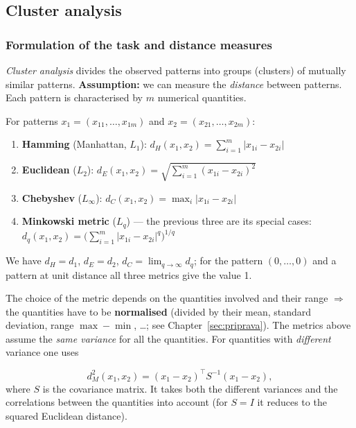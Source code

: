 \documentclass[11pt,a4paper]{article}
\theoremstyle{definition}
\begin{document}
\subsection{Cluster analysis}
\label{ssec:clustering}

\subsubsection{Formulation of the task and distance measures}

\emph{Cluster analysis} divides the observed patterns into groups (clusters) of mutually similar
patterns. \textbf{Assumption:} we can measure the \emph{distance} between patterns. Each pattern is
characterised by $m$ numerical quantities.

\begin{defbox}
For patterns $x_1=(x_{11},\dots,x_{1m})$ and $x_2=(x_{21},\dots,x_{2m})$:
\begin{enumerate}
\item \textbf{Hamming} (Manhattan, $L_1$):
      $d_H(x_1,x_2)=\sum_{i=1}^{m}|x_{1i}-x_{2i}|$
\item \textbf{Euclidean} ($L_2$):
      $d_E(x_1,x_2)=\sqrt{\sum_{i=1}^{m}(x_{1i}-x_{2i})^2}$
\item \textbf{Chebyshev} ($L_\infty$):
      $d_C(x_1,x_2)=\max_i |x_{1i}-x_{2i}|$
\item \textbf{Minkowski metric} ($L_q$) --- the previous three are its special cases:
      $d_q(x_1,x_2)=\Big(\sum_{i=1}^{m}|x_{1i}-x_{2i}|^{q}\Big)^{1/q}$
\end{enumerate}
We have $d_H=d_1$, $d_E=d_2$, $d_C=\lim_{q\to\infty}d_q$; for the pattern $(0,\dots,0)$ and a
pattern at unit distance all three metrics give the value 1.
\end{defbox}

The choice of the metric depends on the quantities involved and their range $\Rightarrow$ the
quantities have to be \textbf{normalised} (divided by their mean, standard deviation, range
$\max-\min$, \dots; see Chapter~\ref{sec:priprava}). The metrics above assume the \emph{same
variance} for all the quantities. For quantities with \emph{different} variance one uses

\begin{defbox}
\[ d_M^2(x_1,x_2)=(x_1-x_2)^{\!\top}S^{-1}(x_1-x_2), \]
where $S$ is the covariance matrix. It takes both the different variances and the correlations
between the quantities into account (for $S=I$ it reduces to the squared Euclidean distance).
\end{defbox}
\end{document}
